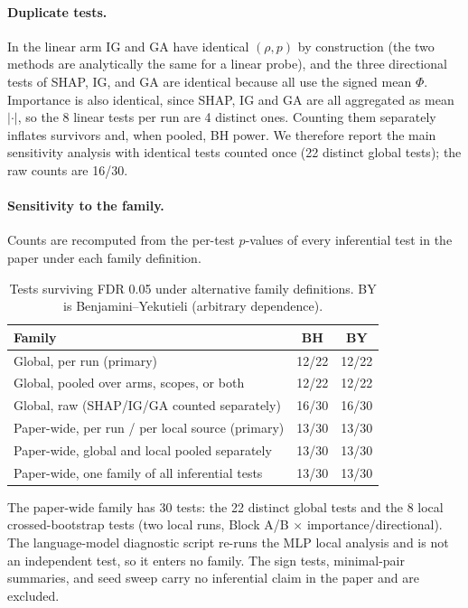 \paragraph{Duplicate tests.} In the linear arm IG and GA have identical
$(\rho, p)$ by construction (the two methods are analytically the same for a
linear probe), and the three directional tests of SHAP, IG, and GA are identical
because all use the signed mean $\Phi$. Importance is also identical, since
SHAP, IG and GA are all aggregated as mean $|\cdot|$, so the 8 linear tests per run
are 4 distinct ones. Counting them separately inflates survivors and, when pooled, BH
power. We therefore report the main sensitivity analysis with identical tests
counted once (22 distinct global tests); the raw counts are 16/30.

\paragraph{Sensitivity to the family.} Counts are recomputed from the per-test $p$-values of every inferential test in the paper under each family definition.
\begin{table}[h]
\centering
\small
\caption{Tests surviving FDR 0.05 under alternative family definitions. BY is
Benjamini--Yekutieli (arbitrary dependence).}
\begin{tabular}{lcc}
\toprule
Family & BH & BY \\
\midrule
Global, per run (primary) & 12/22 & 12/22 \\
Global, pooled over arms, scopes, or both & 12/22 & 12/22 \\
Global, raw (SHAP/IG/GA counted separately) & 16/30 & 16/30 \\
\midrule
Paper-wide, per run / per local source (primary) & 13/30 & 13/30 \\
Paper-wide, global and local pooled separately & 13/30 & 13/30 \\
Paper-wide, one family of all inferential tests & 13/30 & 13/30 \\
\bottomrule
\end{tabular}
\end{table}
The paper-wide family has 30 tests: the 22 distinct global tests and the 8
local crossed-bootstrap tests (two local runs, Block A/B $\times$
importance/directional). The language-model diagnostic script re-runs the MLP
local analysis and is not an independent test, so it enters no family. The sign tests, minimal-pair
summaries, and seed sweep carry no inferential claim in the paper and are
excluded.

